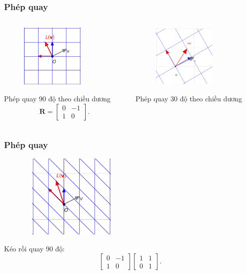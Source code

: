 \begin{frame}
    \frametitle{Phép quay}
    \begin{columns}
        \begin{column}{0.5\textwidth}
            \begin{figure}[H]
                \centering
                \includegraphics[width=3cm, height=3cm]{Slides/Figure/LT7.png}
            \end{figure}
            Phép quay 90 độ theo chiều dương
            \[\mathbf{R}=\begin{bmatrix}
                0&-1\\1&0
            \end{bmatrix}.\]
        \end{column}
        \begin{column}{0.5\textwidth}
            \begin{figure}[H]
                \centering
                \includegraphics[width=3cm, height=3cm]{Slides/Figure/LT8.png}
            \end{figure}
            Phép quay 30 độ theo chiều dương
        \end{column}
    \end{columns}
\end{frame}
\begin{frame}
    \frametitle{Phép quay}
    \begin{figure}[H]
        \centering
        \includegraphics[width=5cm, height=4cm]{Slides/Figure/LT9.png}
    \end{figure}
    Kéo rồi quay 90 độ:
    \[\begin{bmatrix}
        0&-1\\1&0
    \end{bmatrix}\begin{bmatrix}
        1&1\\0&1
    \end{bmatrix}.\]
\end{frame}
